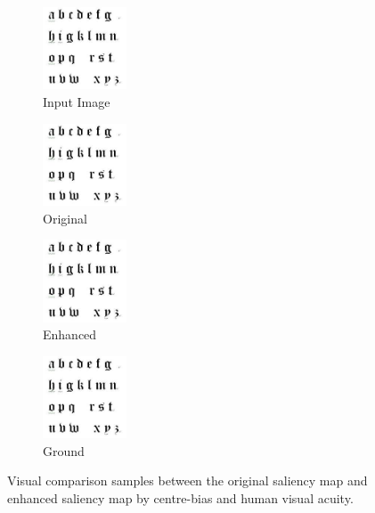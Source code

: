 \documentclass{article}
\begin{document}
\begin{figure}
    \centering
    \begin{subfigure}[b]{0.22\textwidth}
        \includegraphics[width=2.5cm]{figures/abc.jpeg}
        \caption{Input Image}
        \label{fig:visual_smap_o}
    \end{subfigure}
    \begin{subfigure}[b]{0.22\textwidth }
        \includegraphics[width=2.5cm]{figures/abc.jpeg}
        \caption{Original }
        \label{fig:visual_smap_k}
    \end{subfigure}
    \begin{subfigure}[b]{0.22\textwidth }%
        \includegraphics[width=2.5cm]{figures/abc.jpeg}
        \caption{Enhanced }%
        \label{fig:visual_smap_c}%
    \end{subfigure}
    \begin{subfigure}[b]{0.22\textwidth}
        \includegraphics[width=2.5cm]{figures/abc.jpeg}
        \caption{Ground }
        \label{fig:visual_smap_gt}
    \end{subfigure}
    \caption{Visual comparison samples between the original saliency map and enhanced saliency map by centre-bias and human visual acuity.}
\label{fig:visual_smap}
\end{figure}
\end{document}
